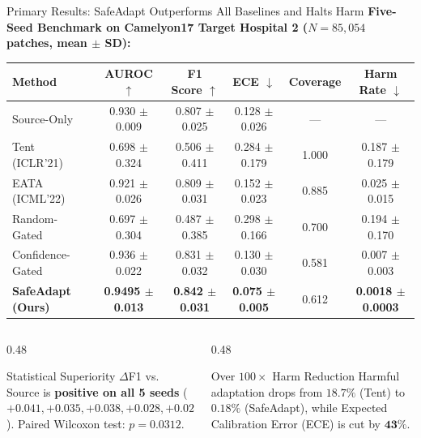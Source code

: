 \documentclass[aspectratio=169,10pt]{beamer}
\begin{document}
\begin{frame}{Primary Results: SafeAdapt Outperforms All Baselines and Halts Harm}
    \small
    \textbf{Five-Seed Benchmark on Camelyon17 Target Hospital 2 ($N = 85,054$ patches, mean $\pm$ SD):}
    \vspace{0.15cm}
    \centering
    \begin{tabular}{lccccc}
        \toprule
        \textbf{Method} & \textbf{AUROC} $\uparrow$ & \textbf{F1 Score} $\uparrow$ & \textbf{ECE} $\downarrow$ & \textbf{Coverage} & \textbf{Harm Rate} $\downarrow$ \\
        \midrule
        Source-Only & 0.930 $\pm$ 0.009 & 0.807 $\pm$ 0.025 & 0.128 $\pm$ 0.026 & --- & --- \\
        Tent (ICLR'21) & 0.698 $\pm$ 0.324 & 0.506 $\pm$ 0.411 & 0.284 $\pm$ 0.179 & 1.000 & 0.187 $\pm$ 0.179 \\
        EATA (ICML'22) & 0.921 $\pm$ 0.026 & 0.809 $\pm$ 0.031 & 0.152 $\pm$ 0.023 & 0.885 & 0.025 $\pm$ 0.015 \\
        Random-Gated & 0.697 $\pm$ 0.304 & 0.487 $\pm$ 0.385 & 0.298 $\pm$ 0.166 & 0.700 & 0.194 $\pm$ 0.170 \\
        Confidence-Gated & 0.936 $\pm$ 0.022 & 0.831 $\pm$ 0.032 & 0.130 $\pm$ 0.030 & 0.581 & 0.007 $\pm$ 0.003 \\
        \midrule
        \textbf{SafeAdapt (Ours)} & \textbf{\textcolor{MedGreen}{0.9495 $\pm$ 0.013}} & \textbf{\textcolor{MedGreen}{0.842 $\pm$ 0.031}} & \textbf{\textcolor{MedGreen}{0.075 $\pm$ 0.005}} & 0.612 & \textbf{\textcolor{MedGreen}{0.0018 $\pm$ 0.0003}} \\
        \bottomrule
    \end{tabular}

    \vspace{0.3cm}
    \begin{columns}[T]
        \begin{column}{0.48\textwidth}
            \begin{block}{Statistical Superiority}
                \scriptsize
                $\Delta$F1 vs. Source is \textbf{positive on all 5 seeds} ($+0.041, +0.035, +0.038, +0.028, +0.022$). Paired Wilcoxon test: \textbf{$p = 0.0312$}.
            \end{block}
        \end{column}
        \begin{column}{0.48\textwidth}
            \begin{block}{Over $100\times$ Harm Reduction}
                \scriptsize
                Harmful adaptation drops from $\mathbf{18.7\%}$ (Tent) to $\mathbf{0.18\%}$ (SafeAdapt), while Expected Calibration Error (ECE) is cut by $\mathbf{43\%}$.
            \end{block}
        \end{column}
    \end{columns}
\end{frame}
\end{document}
